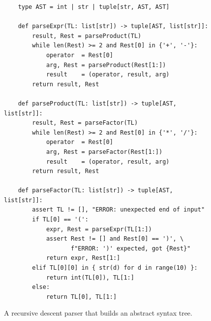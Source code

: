 \begin{figure}[!ht]
\centering
\begin{verbatim}
    type AST = int | str | tuple[str, AST, AST]

    def parseExpr(TL: list[str]) -> tuple[AST, list[str]]:
        result, Rest = parseProduct(TL)
        while len(Rest) >= 2 and Rest[0] in {'+', '-'}:
            operator  = Rest[0]
            arg, Rest = parseProduct(Rest[1:])
            result    = (operator, result, arg)
        return result, Rest

    def parseProduct(TL: list[str]) -> tuple[AST, list[str]]:
        result, Rest = parseFactor(TL)
        while len(Rest) >= 2 and Rest[0] in {'*', '/'}:
            operator  = Rest[0]
            arg, Rest = parseFactor(Rest[1:])
            result    = (operator, result, arg)
        return result, Rest

    def parseFactor(TL: list[str]) -> tuple[AST, list[str]]:
        assert TL != [], "ERROR: unexpected end of input"
        if TL[0] == '(':
            expr, Rest = parseExpr(TL[1:])
            assert Rest != [] and Rest[0] == ')', \
                   f"ERROR: ')' expected, got {Rest}"
            return expr, Rest[1:]
        elif TL[0][0] in { str(d) for d in range(10) }:
            return int(TL[0]), TL[1:]
        else:
            return TL[0], TL[1:]
\end{verbatim}
\vspace*{-0.3cm}
\caption{A recursive descent parser that builds an abstract syntax tree.}
\label{fig:2-EBNF-Parser-AST.ipynb}
\end{figure}

